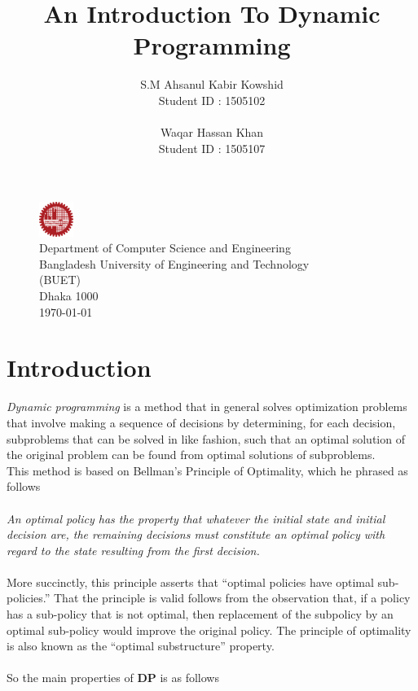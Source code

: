\documentclass[12pt]{article}
\title{	
	\textbf{An Introduction To Dynamic Programming}
	\endgraf\bigskip
}
\author{
	\Large{S.M Ahsanul Kabir Kowshid}\\
	\Large{Student ID : 1505102}\\\\
	\Large{Waqar Hassan Khan}\\
	\Large{Student ID : 1505107}
}
\date{}
\begin{document}
\maketitle

\section*{}
\begin{figure}[b]
	\centering
	
	\captionsetup{justification=centering}
	\includegraphics[width = 0.1\textwidth]{image/buet.png}
	\caption*{
		\Large{Department of Computer Science and Engineering}
		\\
		\Large{Bangladesh University of Engineering and Technology}
		\\
		\Large{(BUET)}
		\\
		\Large{Dhaka 1000}
		\\
		\Large{\today}
	}
	
\end{figure}

\newpage
\tableofcontents
\newpage

\section{Introduction}
\textit{Dynamic programming} is a method that in general solves optimization problems that involve making a sequence of decisions by determining, for each decision, subproblems that can be solved in like fashion, such that an optimal solution of the original problem can be found from optimal solutions of subproblems.\\
This method is based on Bellman’s Principle of Optimality, which
he phrased as follows
\\\\ \textit{An optimal policy has the property that whatever the initial state and
	initial decision are, the remaining decisions must constitute an optimal
	policy with regard to the state resulting from the first decision.
}
\\\\More succinctly, this principle asserts that “optimal policies have optimal
sub-policies.” That the principle is valid follows from the observation that, if a
policy has a sub-policy that is not optimal, then replacement of the subpolicy
by an optimal sub-policy would improve the original policy. The principle
of optimality is also known as the “optimal substructure” property.
\\\\So the main properties of \textbf{DP} is as follows
\end{document}
